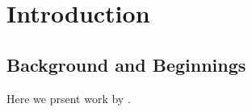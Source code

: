 \chapter{Introduction}\label{chap:intro}
\section{Background and Beginnings}\label{sec:background_begin}
Here we prsent work by \cite{Mott_PhysRev1969, Allen_Nature1960}.